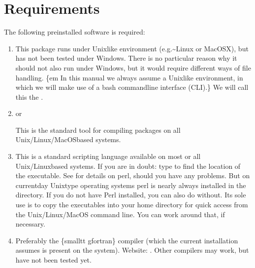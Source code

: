 \documentclass[letterpaper,10pt,english]{sphinxmanual}
\begin{document}
\section{Requirements}
\label{\detokenize{overview:requirements}}
The following pre\sphinxhyphen{}installed software is required:
\begin{enumerate}
%
\item {} 

This package runs under Unix\sphinxhyphen{}like environment (e.g.\textasciitilde{}Linux or MacOSX), but has
not been tested under Windows. There is no particular reason why it should not
also run under Windows, but it would require different ways of file
handling. \{em In this manual we always assume a Unix\sphinxhyphen{}like environment,
in which we will make use of a bash command\sphinxhyphen{}line interface (CLI).\} We will
call this the .

\item {} 
 or 

This is the standard tool for compiling packages on all Unix/Linux/MacOS\sphinxhyphen{}based
systems.

\item {} 

This is a standard scripting language available on most or all
Unix/Linux\sphinxhyphen{}based systems. If you are in doubt: type 
to find the location of the  executable. See  for details on perl, should you have any
problems. But on current\sphinxhyphen{}day Unix\sphinxhyphen{}type operating systems perl is nearly
always installed in the  directory. If you do not
have Perl installed, you can also do without. Its sole use is to copy
the executables into your home  directory for quick
access from the Unix/Linux/MacOS command line. You can work around that,
if necessary.

\item {} 

Preferably the \{smalltt gfortran\} compiler (which the current
installation assumes is present on the system). Website:
. Other compilers may work, but have not
been tested yet.


\end{enumerate}
\end{document}
